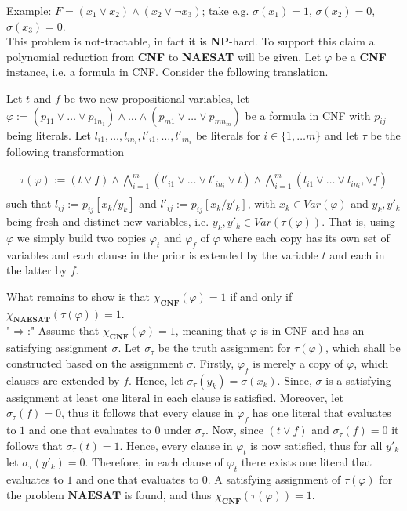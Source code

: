 \documentclass[11pt,a4paper]{article}
\newcommand{\NP}{\ensuremath{\mathbf{NP}}\xspace}
\begin{document}
\begin{enumerate}
\begin{itemize}
        Example: $F = (x_1 \lor x_2 ) \land (x_2 \lor \neg x_3)$; take e.g. $\sigma(x_1)=1$, $\sigma(x_2)=0$, $\sigma(x_3)=0$.  \\
        
        
        
This problem is not-tractable, in fact it is \NP-hard. To support this claim a polynomial reduction from \textbf{CNF} to \textbf{NAESAT} will be given. Let $\varphi$ be a \textbf{CNF} instance, i.e. a formula in CNF. Consider the following translation.  

Let $t$ and $f$ be two new propositional variables, let $\varphi:= (p_{11} \lor \dots \lor p_{1n_1}) \land \dots  \land (p_{m1} \lor \dots \lor p_{mn_m})  $ be a formula in CNF with $p_{ij}$ being literals. Let $l_{i1} , \dots , l_{in_i}, l'_{i1} , \dots , l'_{in_i}$ be literals for $i \in \{1, \dots m\}$ and let $\tau$ be the following transformation

\begin{equation*}
\begin{split}
\tau(\varphi) := (t \lor f) \land  \bigwedge_{i =1}^{m}  (l'_{i1} \lor \dots \lor l'_{in_i} \lor t)  \land \bigwedge_{i =1}^{m}    (l_{i1} \lor \dots \lor l_{in_i}, \lor f) \\
\end{split}
\end{equation*}
such that $l_{ij}:=p_{ij}[x_k/y_k]$ and $l'_{ij}:=p_{ij}[x_k/y'_k]$, with $x_k \in Var(\varphi)$ and $y_k, y'_k$ being fresh and distinct new variables, i.e. $y_k, y'_k \in \mathit{Var}(\tau(\varphi))$.
That is, using $\varphi$ we simply build two copies $\varphi_t$ and $\varphi_f$ of $\varphi$ where each copy has its own set of variables and each clause in the prior is extended by the variable $t$ and each in the latter by $f$.


What remains to show is that $\chi_{\textbf{CNF}}(\varphi) = 1$ if and only if $\chi_{\textbf{NAESAT}}(\tau(\varphi)) = 1$. \\

"$\Rightarrow$:" Assume that $\chi_{\textbf{CNF}}(\varphi) = 1$, meaning that $\varphi$ is in CNF and has an satisfying assignment $\sigma$. Let $\sigma_{\tau}$ be the truth assignment for $\tau(\varphi)$, which shall be constructed based on the assignment $\sigma$. 
Firstly, $\varphi_f$ is merely a copy of $\varphi$, which clauses are extended by $f$. Hence, let $\sigma_{\tau}(y_k)=\sigma(x_k)$. Since, $\sigma$ is a satisfying assignment at least one literal in each clause is  satisfied. Moreover, let $\sigma_{\tau}(f)=0$, thus it follows that every clause in $\varphi_f$ has one literal that evaluates to $1$  and one that evaluates to $0$ under $\sigma_{\tau}$. Now, since $(t \lor f)$ and $\sigma_{\tau}(f)=0$ it follows that $\sigma_{\tau}(t)=1$. Hence, every clause in $\varphi_t$ is now satisfied, thus for all $y'_k$ let $\sigma_{\tau}(y'_k)=0$. Therefore, in each clause of $\varphi_t$ there exists one literal that evaluates to $1$ and one that evaluates to $0$.
A satisfying assignment of $\tau(\varphi)$ for the problem $\textbf{NAESAT}$ is found, and thus $\chi_{\textbf{CNF}}(\tau(\varphi)) = 1$.


\end{itemize}
\end{enumerate}
\end{document}

